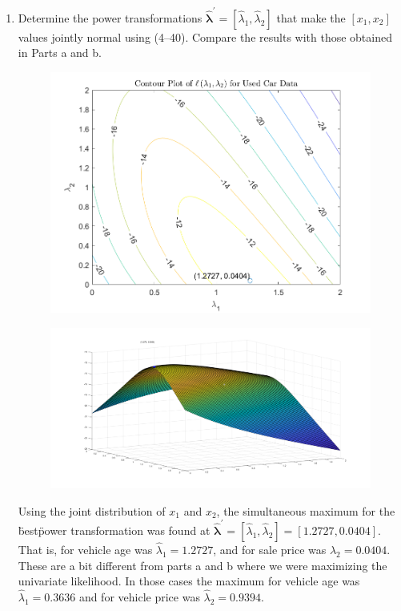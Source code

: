 \begin{enumerate}[label= (\alph*)]
    \item Determine the power transformations $\hat{\bm{\lambda}}^{\prime} = [\hat{\lambda}_{1}, \hat{\lambda}_{2}]$ that make the $[x_{1}, x_{2}]$ values
    jointly normal using (4--40). Compare the results with those obtained in Parts a and b.
    
    \begin{figure}[H]
        \includegraphics[scale=0.8]{./matlab/chapter-4/sol4.30c.png}
    \end{figure}
    \begin{figure}[H]
        \includegraphics[scale=0.3]{./matlab/chapter-4/sol4.30c_surf.png}
    \end{figure}
    \par
    Using the joint distribution of $x_{1}$ and $x_{2}$,
     the simultaneous maximum for the \"best\" power transformation
     was found at $\hat{\bm{\lambda}}^{\prime} = [\hat{\lambda}_{1}, \hat{\lambda}_{2}] = [1.2727, 0.0404]$.
    That is, for vehicle age was $\hat{\lambda}_{1} = 1.2727$, and for sale price was $\hat{\lambda}_{2} = 0.0404$.
    These are a bit different from parts a and b where we were maximizing the univariate likelihood.
    In those cases the maximum for vehicle age was $\hat{\lambda}_{1} = 0.3636$ and for vehicle price was $\hat{\lambda}_{2} = 0.9394$.
\end{enumerate}